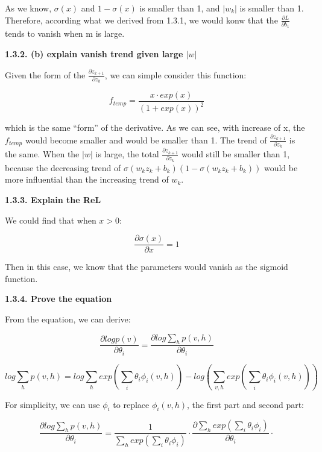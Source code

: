 \documentclass{article} %
\newcommand{\abs}[1]{\left\lvert #1 \right\rvert}
\begin{document}
As we know, $\sigma (x)$ and $1-\sigma (x)$ is smaller than 1, and $\abs{w_k}$
is smaller than 1. Therefore, according what we derived from 1.3.1, we would
konw that the $\frac{\partial L}{\partial b_1}$ tends to vanish when m is large.

\textbf{1.3.2. (b) explain vanish trend given large $\abs{w}$}

Given the form of the $\frac{\partial z_{k+1}}{\partial z_k}$, we can simple
consider this function:

\begin{equation}
f_{temp} = \frac{x \cdot exp(x)}{ (1+exp(x))^2}
\end{equation}

which is the same ``form'' of the derivative. As we can see, with increase of x,
the $f_{temp}$ would become smaller and would be smaller than 1. The trend of
$\frac{\partial z_{k+1}}{\partial z_k}$ is the same. When the $\abs{w}$ is
large, the total $\frac{\partial z_{k+1}}{\partial z_k}$ would still be smaller
than 1, because the decreasing trend of
$\sigma (w_k z_k + b_k) (1- \sigma (w_k z_k + b_k))$ would be more influential
than the increasing trend of $w_k$.

\textbf{1.3.3. Explain the ReL}

We could find that when $x > 0$:

\begin{equation}
\frac{\partial \sigma (x)}{\partial x} = 1
\end{equation}

Then in this case, we know that the parameters would vanish as the sigmoid
function.

\textbf{1.3.4. Prove the equation}

From the equation, we can derive:

\begin{equation}
\frac{\partial log p(v)}{\partial \theta_i} =
\frac{\partial log \sum_h p(v, h)}{\partial \theta_i}
\end{equation}

\begin{equation}
log \sum_h p(v,h) = log \sum_h exp(\sum_i \theta_i \phi_i (v,h))
- log (\sum_{v,h} exp (\sum_i \theta_i \phi_i (v,h)))
\end{equation}

For simplicity, we can use $\phi_i$ to replace $\phi_i (v,h)$,
the first part and second part:

\begin{equation}
\frac{\partial log \sum_h p(v,h)}{\partial \theta_i} =
\frac{1}{\sum_h exp(\sum_i \theta_i \phi_i)} \cdot
\frac{\partial \sum_h exp(\sum_i \theta_i \phi_i)}{\partial \theta_i} \cdot
\end{equation}
\end{document}

